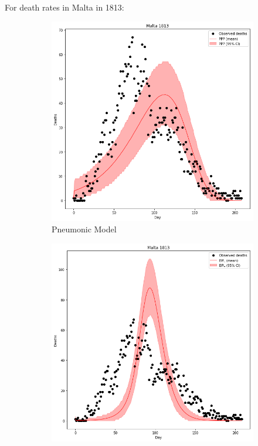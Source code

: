 \documentclass [letterpaper, 12pt] {article}
\begin{document}
\newpage
For death rates in Malta in 1813:

\begin{figure}[H]
	\begin{subfigure}{0.48\textwidth}
	\includegraphics[width=\linewidth]{pneum_malta.png}
	\caption{Pneumonic Model}
	\end{subfigure}\hspace{\fill}
	\begin{subfigure}{0.48\textwidth}
	\includegraphics[width=\linewidth]{rats1_malta.png}

\end{subfigure}
\end{figure}
\end{document}

